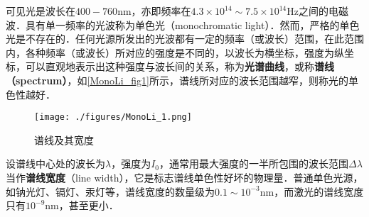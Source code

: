 

可见光是波长在$400-760\mathrm{nm}$，亦即频率在$4.3 \times 10^{14} \sim 7.5 \times 10^{14} \mathrm{Hz}$之间的电磁波．具有单一频率的光波称为单色光（monochromatic light）．然而，严格的单色光是不存在的．任何光源所发出的光波都有一定的频率（或波长）范围，在此范围内，各种频率（或波长）所对应的强度是不同的，以波长为横坐标，强度为纵坐标，可以直观地表示出这种强度与波长间的关系，称为\textbf{光谱曲线}，或称\textbf{谱线（spectrum）}，如\autoref{MonoLi_fig1}所示，谱线所对应的波长范围越窄，则称光的单色性越好．
\begin{figure}[ht]
\centering
\texttt{[image: ./figures/MonoLi\_1.png]}
\caption{谱线及其宽度} \label{MonoLi_fig1}
\end{figure}

设谱线中心处的波长为$\lambda$，强度为$I_0$，通常用最大强度的一半所包围的波长范围$\Delta\lambda$当作\textbf{谱线宽度}（line width），它是标志谱线单色性好坏的物理量．普通单色光源，如钠光灯、镉灯、汞灯等，谱线宽度的数量级为$0.1 \sim 10^{-3} \mathrm{nm}$，而激光的谱线宽度只有$10^{-9}\mathrm{nm}$，甚至更小．
